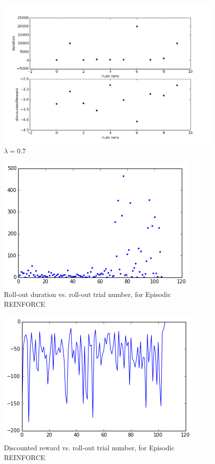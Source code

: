 \documentclass{article}
\begin{document}
\begin{figure}
\centering
\includegraphics[scale=0.5]{figures/qlearningMultiple.png}
\caption{$\lambda = 0.7$}
\label{figures/qlearningMultiple.png}
\end{figure}


\begin{figure}
\centering
\includegraphics[scale=0.5]{figures/policySearch_zeroVector_duration.png}
\caption{Roll-out duration vs. roll-out trial number, for Episodic REINFORCE}
\label{figures/policySearch_zeroVector_duration.png}
\end{figure}


\begin{figure}
\centering
\includegraphics[scale=0.5]{figures/policySearch_zeroVector_discR.png}
\caption{Discounted reward vs. roll-out trial number, for Episodic REINFORCE}
\label{figures/policySearch_zeroVector_discR.png}
\end{figure}
\end{document}
